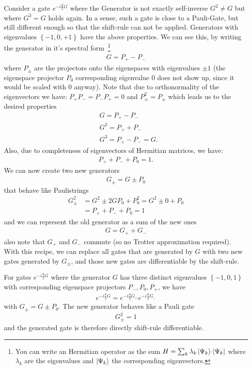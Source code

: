 Consider a gate $e^{-i\frac{\theta}{2}G}$ where the Generator is not exactly self-inverse $G^2\neq G$ but where $G^3=G$ holds again. 
In a sense, such a gate is close to a Pauli-Gate, but still different enough so that the shift-rule can not be applied.
Generators with eigenvalues $\left\{-1,0,+1\right\}$ have the above properties.
We can see this, by writing the generator in it's spectral form~\footnote{You can write an Hermitian operator as the sum $H = \sum_k \lambda_k \ket{\Psi_k}\bra{\Psi_k}$ where $\lambda_k$ are the eigenvalues and $\ket{\Psi_k}$ the corresponding eigenvectors.}
\begin{align}
    G = P_+ - P_-
\end{align}
where $P_\pm$ are the projectors onto the eigenspaces with eigenvalues $\pm1$ (the eigenspace projector $P_0$ corresponding eigenvalue 0 does not show up, since it would be scaled with 0 anyway).
Note that due to orthonormality of the eigenvectors we have: $P_+P_- = P_- P_+= 0$ and $P_\pm^2 = P_\pm$ which leads us to the desired properties
\begin{align}
    &G = P_+ - P_-\\
    &G^2 = P_+ + P_-\\
    &G^3 = P_+ - P_- = G.
\end{align}
Also, due to completeness of eigenvectors of Hermitian matrices, we have: 
\begin{align}
    P_+ + P_- + P_0 = 1.
\end{align}
We can now create two new generators
\begin{align}
    G_{\pm} = G \pm P_0
\end{align}
that behave like Paulistrings
\begin{align}
    G_\pm^2 &= G^2 \pm 2GP_0 + P_0^2 = G^2 \pm 0 + P_0 \nonumber\\
    &= P_+ + P_- + P_0 =  1
\end{align}
and we can represent the old generator as a sum of the new ones
\begin{align}
    G = G_+ + G_-
\end{align}
also note that $G_+$ and $G_-$ commute (so no Trotter approximation required).
With this recipe, we can replace all gates that are generated by $G$ with two new gates generated by $G_\pm$, and those new gates are differentiable by the shift-rule.
\begin{algo*}
For gates $e^{-i\frac{\theta}{2}G}$ where the generator $G$ has three distinct eigenvalues $\left\{-1,0,1\right\}$ with corresponding eigenspace projectors $P_{-}, P_0, P_+$, we have
\begin{align}
    e^{-i\frac{\theta}{2} G} = e^{-i\frac{\theta}{2}G_+}e^{-i\frac{\theta}{2}G_-}
\end{align}
with $G_\pm = G \pm P_0$. The new generator behaves like a Pauli gate
\begin{align}
    G_\pm^2 = 1
\end{align}
and the generated gate is therefore directly shift-rule differentiable.
\end{algo*}
